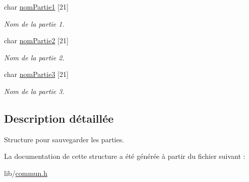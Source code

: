 \begin{DoxyCompactItemize}
\mbox{\label{structsauv__t_a75b651752f1b9a386546b66baf42f468}} 
char \hyperlink{structsauv__t_a75b651752f1b9a386546b66baf42f468}{nom\+Partie1} \mbox{[}21\mbox{]}
\begin{DoxyCompactList}\small\item\em Nom de la partie 1. \end{DoxyCompactList}\item 
\mbox{\label{structsauv__t_a81184fffa3a2b6172e6a5f92a24db958}} 
char \hyperlink{structsauv__t_a81184fffa3a2b6172e6a5f92a24db958}{nom\+Partie2} \mbox{[}21\mbox{]}
\begin{DoxyCompactList}\small\item\em Nom de la partie 2. \end{DoxyCompactList}\item 
\mbox{\label{structsauv__t_a074bdb9167b9c403370dbfddcca38390}} 
char \hyperlink{structsauv__t_a074bdb9167b9c403370dbfddcca38390}{nom\+Partie3} \mbox{[}21\mbox{]}
\begin{DoxyCompactList}\small\item\em Nom de la partie 3. \end{DoxyCompactList}\end{DoxyCompactItemize}


\subsection{Description détaillée}
Structure pour sauvegarder les parties. 

La documentation de cette structure a été générée à partir du fichier suivant \+:\begin{DoxyCompactItemize}
\item 
lib/\hyperlink{commun_8h}{commun.\+h}\end{DoxyCompactItemize}
